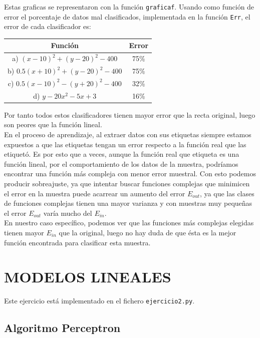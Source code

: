 \documentclass{article}
\begin{document}
Estas graficas se representaron con la función \texttt{graficaf}.
Usando como función de error el porcentaje de datos mal clasificados, implementada en la función \texttt{Err}, el error de cada clasificador es:

\begin{center}
\begin{tabular}{|c|c|}
\hline
\multicolumn{1}{|c|}{\textbf{Función}}& 
\textbf{Error}  \\ \hline
  a) $(x-10)^2+(y-20)^2-400$    & 75\% \\
  b) $0.5(x+10)^2+(y-20)^2-400$ & 75\% \\
  c) $0.5(x-10)^2-(y+20)^2-400$ & 32\% \\
  d) $y-20x^2-5x+3$             & 16\% \\ \hline
\end{tabular}
\end{center}

Por tanto todos estos clasificadores tienen mayor error que la recta original, luego son peores que la función lineal.\\

En el proceso de aprendizaje, al extraer datos con sus etiquetas siempre estamos expuestos a que las etiquetas tengan un error respecto a la función real que las etiquetó. Es por esto que a veces, aunque la función real que etiqueta es una función lineal, por el comportamiento de los datos de la muestra, podríamos encontrar una función más compleja con menor error muestral. Con esto podemos producir sobreajuste, ya que intentar buscar funciones complejas que minimicen el error en la muestra puede acarrear un aumento del error $E_{out}$, ya que las clases de funciones complejas tienen una mayor varianza y con muestras muy pequeñas el error $E_{out}$ varía mucho del $E_{in}$.\\
En nuestro caso específico, podemos ver que las funciones más complejas elegidas tienen mayor $E_{in}$ que la  original, luego no hay duda de que ésta es la mejor función encontrada para clasificar esta muestra.

\section{MODELOS LINEALES}

Este ejercicio está implementado en el fichero \texttt{ejercicio2.py}.\\

\subsection{Algoritmo Perceptron}
\end{document}
